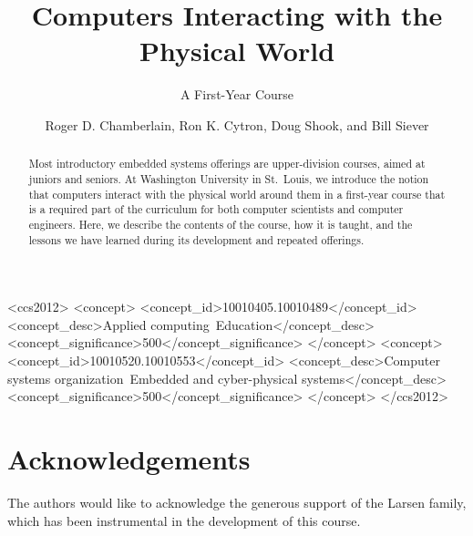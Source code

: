 \documentclass[sigconf]{acmart}
\begin{document}
\title{Computers Interacting with the Physical World}
\subtitle{A First-Year Course}


\author{Roger D. Chamberlain, Ron K. Cytron, Doug Shook, and Bill Siever}


\renewcommand{\shortauthors}{R. D. Chamberlain et al.}

\newcommand{\FIXME}[1]{\textcolor{red}{FIXME: #1}}

\begin{abstract}
Most introductory embedded systems offerings are upper-division courses,
aimed at juniors and seniors.  At Washington University in St.~Louis, we
introduce the notion that computers interact with the physical world
around them in a first-year course that is a required part of the
curriculum for both computer scientists and computer engineers.
Here, we describe the contents of the course, how it is taught, and
the lessons we have learned during its development and repeated
offerings.
\end{abstract}

%
%
 \begin{CCSXML}
<ccs2012>
<concept>
<concept_id>10010405.10010489</concept_id>
<concept_desc>Applied computing~Education</concept_desc>
<concept_significance>500</concept_significance>
</concept>
<concept>
<concept_id>10010520.10010553</concept_id>
<concept_desc>Computer systems organization~Embedded and cyber-physical systems</concept_desc>
<concept_significance>500</concept_significance>
</concept>
</ccs2012>
\end{CCSXML}





\maketitle








\section*{Acknowledgements}
The authors would like to acknowledge
the generous support of the Larsen family, which has been instrumental
in the development of this course.



\end{document}
